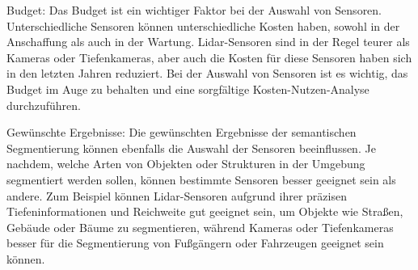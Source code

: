 Budget: Das Budget ist ein wichtiger Faktor bei der Auswahl von Sensoren.
Unterschiedliche Sensoren können unterschiedliche Kosten haben, sowohl in der
Anschaffung als auch in der Wartung. Lidar-Sensoren sind in der Regel teurer
als Kameras oder Tiefenkameras, aber auch die Kosten für diese Sensoren haben
sich in den letzten Jahren reduziert. Bei der Auswahl von Sensoren ist es
wichtig, das Budget im Auge zu behalten und eine sorgfältige
Kosten-Nutzen-Analyse durchzuführen.

Gewünschte Ergebnisse: Die gewünschten Ergebnisse der semantischen
Segmentierung können ebenfalls die Auswahl der Sensoren beeinflussen. Je
nachdem, welche Arten von Objekten oder Strukturen in der Umgebung segmentiert
werden sollen, können bestimmte Sensoren besser geeignet sein als andere. Zum
Beispiel können Lidar-Sensoren aufgrund ihrer präzisen Tiefeninformationen und
Reichweite gut geeignet sein, um Objekte wie Straßen, Gebäude oder Bäume zu
segmentieren, während Kameras oder Tiefenkameras besser für die Segmentierung
von Fußgängern oder Fahrzeugen geeignet sein können.